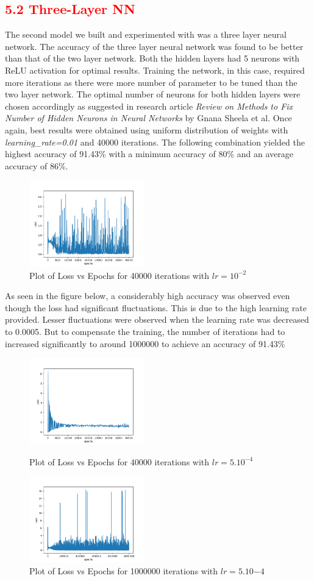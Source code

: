 \documentclass[a4paper,10pt,twocolumn]{article}
\begin{document}
\subsection*{\textcolor{red}{5.2 Three-Layer NN}}
The second model we built and experimented with was a three layer neural network. The accuracy of the three layer neural network was found to be better than that of the two layer network. Both the hidden layers had 5 neurons with ReLU activation for optimal results. Training the network, in this case, required more iterations as there were more number of parameter to be tuned than the two layer network. The optimal number of neurons for both hidden layers were chosen accordingly as suggested in research article \textit{Review on Methods to Fix Number of Hidden Neurons in Neural Networks} by Gnana Sheela et al. Once again, best results were obtained using uniform distribution of weights with \textit{learning\_rate=0.01} and 40000 iterations. The following combination yielded the highest accuracy of 91.43\% with a minimum accuracy of 80\% and an average accuracy of 86\%.
\begin{figure}[h]
\centering
\includegraphics[scale=1.0, width=5cm]{Fig21.png}
\caption{Plot of Loss vs Epochs for 40000 iterations with $lr=10^{-2}$}
\end{figure}
As seen in the figure below, a considerably high accuracy was observed even though the loss had significant fluctuations. This is due to the high learning rate provided. Lesser fluctuations were observed when the learning rate was decreased to 0.0005. But to compensate the training, the number of iterations had to increased significantly to around 1000000 to achieve an accuracy of 91.43\%
\begin{figure}[h]
\centering
\includegraphics[scale=1.0, width=5cm]{Fig22.png}
\caption{Plot of Loss vs Epochs for 40000 iterations with $lr=5.10^{-4}$}
\includegraphics[scale=1.0, width=5cm]{Fig23.png}
\caption{Plot of Loss vs Epochs for 1000000 iterations with $lr=5.10{-4}$}
\end{figure}
\end{document}
